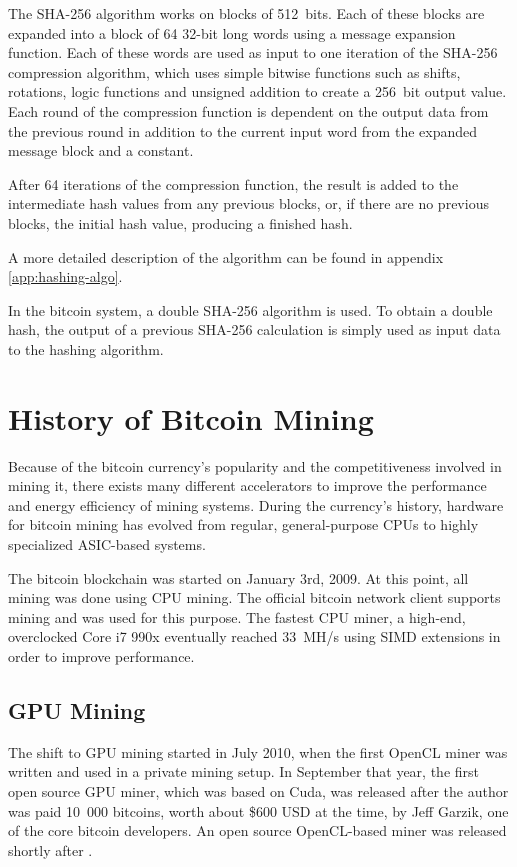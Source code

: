 The SHA-256 algorithm works on blocks of 512~bits. Each of these blocks are expanded into a
block of 64 32-bit long words using a message expansion function. Each of these words are
used as input to one iteration of the SHA-256 compression algorithm, which uses simple bitwise functions
such as shifts, rotations, logic functions and unsigned addition to create a 256~bit
output value. Each round of the compression function is dependent on the output data from
the previous round in addition to the current input word from the expanded message block
and a constant.

After 64 iterations of the compression function, the result is added to the intermediate
hash values from any previous blocks, or, if there are no previous blocks, the initial
hash value, producing a finished hash.

A more detailed description of the algorithm can be found in appendix \ref{app:hashing-algo}.

In the bitcoin system, a double SHA-256 algorithm is used. To obtain a double hash, the
output of a previous SHA-256 calculation is simply used as input data to the hashing
algorithm. \cite{fips180-4}


\section{History of Bitcoin Mining}

Because of the bitcoin currency's popularity and the competitiveness involved in mining it, there exists
many different accelerators to improve the performance and energy efficiency of mining systems.
During the currency's history, hardware for bitcoin mining has evolved from regular, general-purpose
CPUs to highly specialized ASIC-based systems.

The bitcoin blockchain was started on January 3rd, 2009. At this point, all mining was done
using CPU mining. The official bitcoin network client supports mining and was used for this
purpose. The fastest CPU miner, a high-end, overclocked Core i7 990x eventually reached 33~MH/s
using SIMD extensions in order to improve performance. \cite{bitcoin-history}

\subsection{GPU Mining}
The shift to GPU mining started in July 2010, when the first OpenCL miner was written and
used in a private mining setup. In September that year, the first open source GPU miner,
which was based on Cuda, was released after the author was paid 10~000 bitcoins, worth about
\$600 USD at the time, by Jeff Garzik, one of the core bitcoin developers. An open source
OpenCL-based miner was released shortly after \cite{bitcoin-history}.

